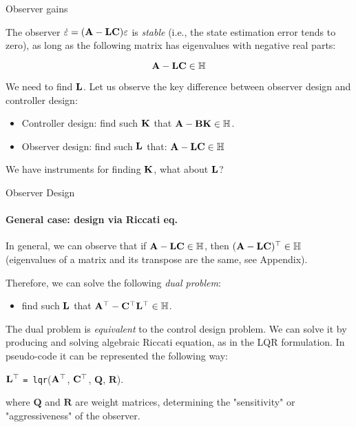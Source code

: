 \documentclass{beamer}
\begin{document}
\begin{frame}{Observer gains}
\begin{flushleft}

The observer $\dot {\varepsilon}= 
(\mathbf{A} - \mathbf{L} \mathbf{C}) \varepsilon$ is \emph{stable} (i.e., the state estimation error tends to zero), as long as the following matrix has eigenvalues with negative real parts:

\[
\mathbf{A} - 
\mathbf{L} \mathbf{C} \in \mathbb{H}
\]

We need to find $\mathbf{L}$. Let us observe the key difference between observer design and controller design:

\bigskip

\begin{itemize}
    \item Controller design: find such $\mathbf{K}$ that $\mathbf{A} - \mathbf{B} \mathbf{K} \in \mathbb{H}$.
    \item Observer design: find such $\mathbf{L}$ that: $\mathbf{A} - \mathbf{L} \mathbf{C} \in \mathbb{H}$
\end{itemize}

\bigskip

We have instruments for finding $\mathbf{K}$, what about $\mathbf{L}$?

\end{flushleft}
\end{frame}


\begin{frame}{Observer Design}
\framesubtitle{General case: design via Riccati eq.}
\begin{flushleft}

In general, we can observe that if $\mathbf{A} - \mathbf{L} \mathbf{C}\in \mathbb{H}$, then $(\mathbf{A} - 
\mathbf{L} \mathbf{C})^{\top}\in \mathbb{H}$ (eigenvalues of a matrix and its transpose are the same, see Appendix). 

\bigskip

Therefore, we can solve the following \emph{dual problem}:

\begin{itemize}
    \item find such $\mathbf{L}$ that $\mathbf{A}^{\top} - 
\mathbf{C}^{\top} \mathbf{L}^{\top} \in \mathbb{H}$.
\end{itemize}

\bigskip

The dual problem is \emph{equivalent} to the control design problem. We can solve it by producing and solving algebraic Riccati equation, as in the LQR formulation. In pseudo-code it can be represented the following way:

\bigskip

$\mathbf{L}^{\top}$ \texttt{= lqr}($\mathbf{A}^{\top}$, $\mathbf{C}^{\top}$, $\mathbf Q$, $\mathbf R$).

where $\mathbf Q$ and $\mathbf R$ are weight  matrices, determining the "sensitivity" or "aggressiveness" of the observer.


\end{flushleft}
\end{frame}
\end{document}
